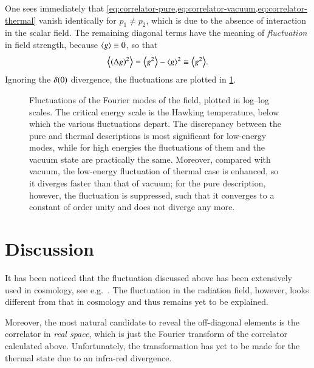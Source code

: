 One sees immediately that 
\cref{eq:correlator-pure,eq:correlator-vacuum,eq:correlator-thermal} vanish 
identically for $p_1 \neq p_2$, which is due to the absence of interaction in 
the scalar field. The remaining diagonal terms have the meaning of 
\emph{fluctuation} in field strength, because ${\left<g\right>} \equiv 0$, so that
\begin{equation}
	{\left<{\left(\Delta g\right)}^2\right>} = {\left<g^2\right>} - {\left<g\right>}^2 \equiv {\left<g^2\right>}.
\end{equation}
Ignoring the ${\delta}\mathopen{}\left(0\right)\mathclose{}$ divergence, the fluctuations are plotted in
\cref{fig:fluc-Fourier}.

\begin{figure}
\begin{center}

\end{center}
\caption[Fluctuations of the Fourier modes]{Fluctuations of the Fourier modes 
of the field, plotted in log--log scales. The critical energy scale is the
Hawking temperature, below which the various fluctuations depart. The 
discrepancy between the pure and thermal descriptions is most significant for 
low-energy modes, while for high energies the fluctuations of them and 
the vacuum state are practically the same. Moreover, compared with vacuum, the 
low-energy fluctuation of thermal case is enhanced, so it diverges faster than 
that of vacuum; for the pure description, however, the fluctuation is 
suppressed, such that it converges to a constant of order unity and does not 
diverge any more. \label{fig:fluc-Fourier}}
\end{figure}

\section{Discussion}
\label{sec:corr-discussion}

It has been noticed that the fluctuation discussed above has been extensively 
used in cosmology, see e.g.\ \cite{Glenz2009}. The fluctuation in the 
radiation field, however, looks different from that in cosmology and thus 
remains yet to be explained.

Moreover, the most natural candidate to reveal the off-diagonal elements is the 
correlator in \emph{real space}, which is just the Fourier transform of the 
correlator calculated above. Unfortunately, the transformation has yet to be 
made for the thermal state due to an infra-red divergence.


